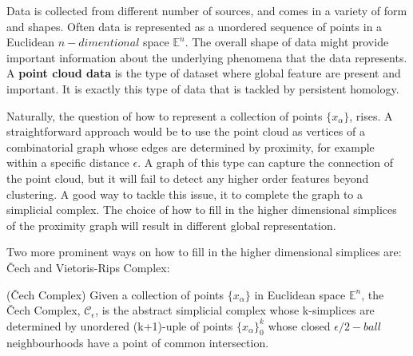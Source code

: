 \documentclass[11pt,a4paper]{report}
\begin{document}
              Data is collected from different number of sources, and comes in a variety of form and shapes. Often data is represented as a unordered sequence of points in a Euclidean $n-dimentional$ space $\mathbb{E}^n$. The overall shape of data might provide important information about the underlying phenomena that
              the data represents. A \textbf{point cloud data} is the type of dataset where global feature are present and important. It is exactly this type of data that is tackled by persistent homology. \cite{Ghrist_2007}
              
              Naturally, the question of how to represent a collection of points $\{x_\alpha\}$, rises. 
              A straightforward approach would be to use the point cloud as vertices of a combinatorial graph whose
              edges are determined by proximity, for example within a specific distance $\epsilon$. A graph of this type can capture the connection of the point cloud,
              but it will fail to detect any higher order features beyond clustering. 
              A good way to tackle this issue, it to complete the graph to a simplicial complex. The choice of how to fill in the higher dimensional simplices of the proximity graph will result in different global representation. 
              
              Two more prominent ways on how to fill in the higher dimensional simplices are:  \v{C}ech and Vietoris-Rips Complex: 
              
              \begin{defn} \label{cech} (\v{C}ech Complex)
           Given a collection of points $\{x_\alpha\}$ in Euclidean space $\mathbb{E}^n$, the \v{C}ech Complex, $\mathcal{C}_\epsilon$, is the abstract simplicial complex whose k-simplices are determined by unordered (k+1)-uple of points $\{x_\alpha\}_0^k$ whose closed $\epsilon/2-ball$ neighbourhoods have a point of common intersection. 
              \end{defn}
           
\end{document}
